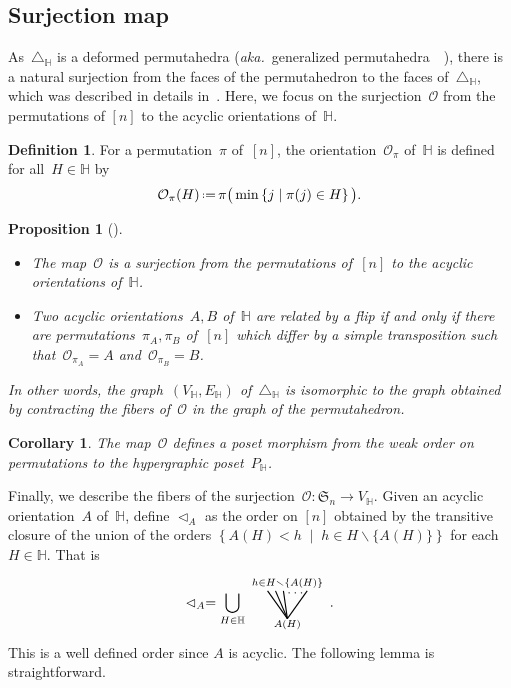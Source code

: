 \documentclass[reqno]{amsart}
\newtheorem{corollary}[theorem]{Corollary}
\newtheorem{proposition}[theorem]{Proposition}
\theoremstyle{definition}
\newtheorem{definition}[theorem]{Definition}
\newcommand{\set}[2]{\left\{ #1 \;\middle|\; #2 \right\}} %
\newcommand{\ssm}{\smallsetminus} %
\newcommand{\eqdef}{\mbox{\,\raisebox{0.2ex}{\scriptsize\ensuremath{\mathrm:}}\ensuremath{=}\,}} %
\newcommand{\simplex}{\triangle} %
\newcommand{\aka}{\textit{aka.}~} %
\newcommand{\fS}{\mathfrak{S}} %
\newcommand{\less}{\vartriangleleft} %
\newcommand{\Or}{\mathcal O}  %
\newcommand{\HH}{\mathbb H}  %
\begin{document}

\subsection{Surjection map} 
\label{subsec:surjection}

As~$\simplex_\HH$ is a deformed permutahedra (\aka generalized permutahedra~~\cite{Postnikov, PostnikovReinerWilliams}), there is a natural surjection from the faces of the permutahedron to the faces of~$\simplex_\HH$, which was described in details in~\cite[Lem.~2.9]{BenedettiBergeronMachacek}.
Here, we focus on the surjection~$\Or$ from the permutations of $[n]$ to the acyclic orientations of~$\HH$.

\begin{definition}
\label{def:surjection}
For a permutation~$\pi$ of~$[n]$, the orientation~$\Or_\pi$ of~$\HH$ is defined for all~$H \in \HH$ by
\[
\Or_\pi(H) \eqdef  \pi\big(\min\set{j}{\pi(j)\in H}\big).
\]
\end{definition}

\begin{proposition}[{\cite[Lem.~2.9]{BenedettiBergeronMachacek}}] ~
\begin{itemize}
\item The map~$\Or$ is a surjection from the permutations of~$[n]$ to the acyclic orientations of~$\HH$.
\item Two acyclic orientations~$A,B$ of~$\HH$ are related by a flip if and only if there are permutations~$\pi_A, \pi_B$ of~$[n]$ which differ by a simple transposition such that~$\Or_{\pi_A} = A$ and~$\Or_{\pi_B} = B$.
\end{itemize}
In other words, the graph~$(V_\HH, E_\HH)$ of~$\simplex_\HH$ is isomorphic to the graph obtained by contracting the fibers of~$\Or$ in the graph of the permutahedron.
\end{proposition}

\begin{corollary}
\label{coro:weakToP}
The map~$\Or$ defines a poset morphism from the weak order on permutations to the hypergraphic poset~$P_\HH$.
\end{corollary}

Finally, we describe the fibers of the surjection~$\Or : \fS_n \to V_\HH$.
Given an acyclic orientation~$A$ of~$\HH$, define $\less_A$ as the order on $[n]$ obtained by the transitive closure of the union of the \linebreak orders $\set{A(H) < h}{h \in H \ssm \{A(H)\}}$ for each $H \in \HH$.
That is
\[
	\less_A =  \bigcup_{H \in \HH} 
	\begin{tikzpicture}[scale=1,baseline=.0cm]
		\node at (0,-.45) {$\scriptstyle A(H)$};
		\node at (0,.6) {$\scriptstyle h \in H \ssm \{A(H)\}$};
		\node at (.2,.35) {$\ldots$};
		\draw [thick] (0,-.3)--(-.5,.4); 
		\draw [thick] (0,-.3)--(-.3,.4); 
		\draw [thick] (0,-.3)--(-.1,.4); 
		\draw [thick] (0,-.3)--(.5,.4); 
	\end{tikzpicture} \,.
\]
This is a well defined order since $A$ is acyclic.
The following lemma is straightforward.
\end{document}
